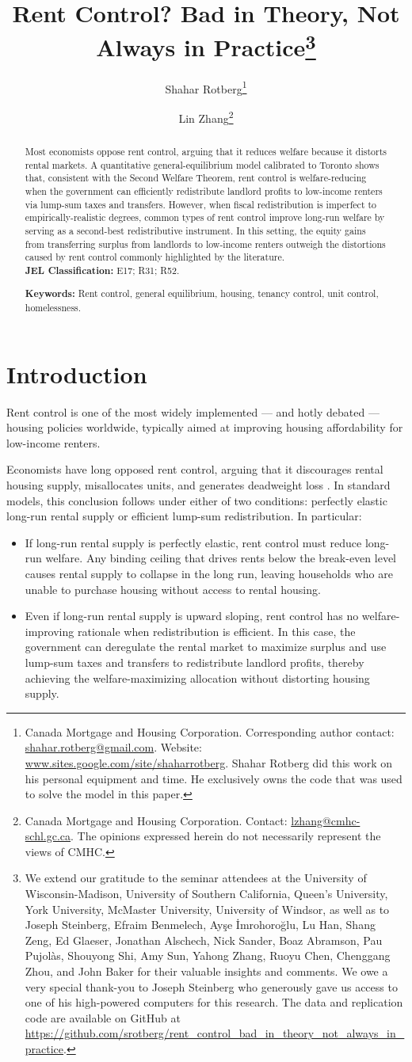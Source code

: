 \documentclass[parskip=full]{article}
\title{\vspace{-1.8cm}Rent Control? Bad in Theory, Not Always in Practice\footnote{We extend our gratitude to the seminar attendees at the University of Wisconsin-Madison, University of Southern California, Queen's University, York University, McMaster University, University of Windsor, as well as to Joseph Steinberg, Efraim Benmelech, Ay\c{s}e \.{I}mrohoro\u{g}lu, Lu Han, Shang Zeng, Ed Glaeser, Jonathan Alschech, Nick Sander, Boaz Abramson, Pau Pujol\`as, Shouyong Shi, Amy Sun, Yahong Zhang, Ruoyu Chen, Chenggang Zhou, and John Baker for their valuable insights and comments. We owe a very special thank-you to Joseph Steinberg who generously gave us access to one of his high-powered computers for this research. The data and replication code are available on GitHub at \url{https://github.com/srotberg/rent_control_bad_in_theory_not_always_in_practice}.}}
\author{Shahar Rotberg\footnote{Canada Mortgage and Housing Corporation. Corresponding author contact: \url{shahar.rotberg@gmail.com}. Website: \url{www.sites.google.com/site/shaharrotberg}. Shahar Rotberg did this work on his personal equipment and time. He exclusively owns the code that was used to solve the model in this paper.} \and Lin Zhang\footnote{Canada Mortgage and Housing Corporation. Contact: \url{lzhang@cmhc-schl.gc.ca}. The opinions expressed herein do not necessarily represent the views of CMHC.}}
\begin{document}
\maketitle

\begin{abstract}
\onehalfspacing

\noindent Most economists oppose rent control, arguing that it reduces welfare because it distorts rental markets. A quantitative general-equilibrium model calibrated to Toronto shows that, consistent with the Second Welfare Theorem, rent control is welfare-reducing when the government can efficiently redistribute landlord profits to low-income renters via lump-sum taxes and transfers. However, when fiscal redistribution is imperfect to empirically-realistic degrees, common types of rent control improve long-run welfare by serving as a second-best redistributive instrument. In this setting, the equity gains from transferring surplus from landlords to low-income renters outweigh the distortions caused by rent control commonly highlighted by the literature.
\\[1.5ex]

\noindent \textbf{JEL Classification:} E17; R31; R52. 

\noindent \textbf{Keywords:} Rent control, general equilibrium, housing, tenancy control, unit control, homelessness.
\end{abstract}

\section{Introduction}

Rent control is one of the most widely implemented — and hotly debated — housing policies worldwide, typically aimed at improving housing affordability for low-income renters.

Economists have long opposed rent control, arguing that it discourages rental housing supply, misallocates units, and generates deadweight loss \citep{gl-2003}. In standard models, this conclusion follows under either of two conditions: perfectly elastic long-run rental supply or efficient lump-sum redistribution. In particular:

\begin{itemize}
\item If long-run rental supply is perfectly elastic, rent control must reduce long-run welfare. Any binding ceiling that drives rents below the break-even level causes rental supply to collapse in the long run, leaving households who are unable to purchase housing without access to rental housing.
\item Even if long-run rental supply is upward sloping, rent control has no welfare-improving rationale when redistribution is efficient. In this case, the government can deregulate the rental market to maximize surplus and use lump-sum taxes and transfers to redistribute landlord profits, thereby achieving the welfare-maximizing allocation without distorting housing supply.
\end{itemize}
\end{document}
